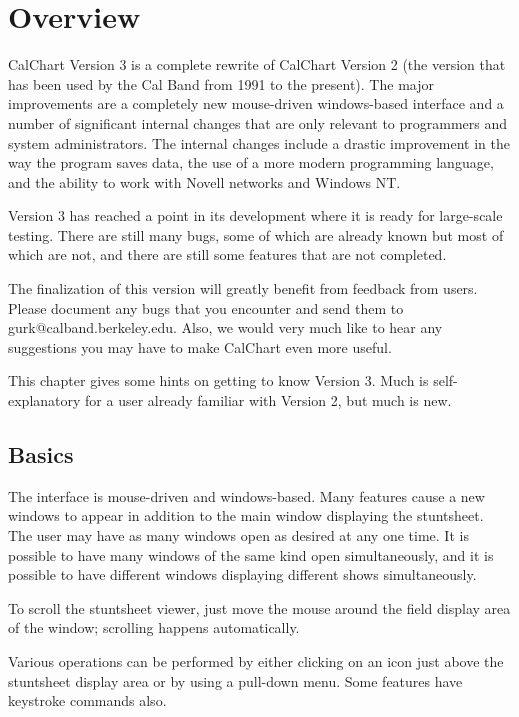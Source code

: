 \chapter{Overview}\label{overview}

CalChart Version 3 is a complete rewrite of CalChart Version 2 (the version
that has been used by the Cal Band from 1991 to the present).  The major
improvements are a completely new mouse-driven windows-based interface and
a number of significant internal changes that are only relevant to
programmers and system administrators.  The internal changes include a
drastic improvement in the way the program saves data, the use of a 
more modern programming language, and the ability to work with Novell
networks and Windows NT.

Version 3 has reached a point in its development where it is ready for
large-scale testing.  There are still many bugs, some of which are already
known but most of which are not, and there are still some features that
are not completed.

The finalization of this version will greatly benefit from feedback from
users.  Please document any bugs that you encounter and send them to
gurk@calband.berkeley.edu.  Also, we would very much like to hear any
suggestions you may have to make CalChart even more useful.

This chapter gives some hints on getting to know Version 3.  Much is
self-explanatory for a user already familiar with Version 2, but much is
new.

\section{Basics}\label{basics}

The interface is mouse-driven and windows-based.  Many features cause a new
windows to appear in addition to the main window displaying the stuntsheet.
The user may have as many windows open as desired at any one time.  It
is possible to have many windows of the same kind open simultaneously,
and it is possible to have different windows displaying different shows
simultaneously.

To scroll the stuntsheet viewer, just move the mouse around the field
display area of the window; scrolling happens automatically.

Various operations can be performed by either clicking on an icon just
above the stuntsheet display area or by using a pull-down menu.  Some
features have keystroke commands also.

